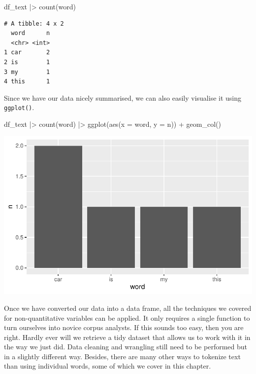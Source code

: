 \documentclass[
  letterpaper,
]{krantz}
\makeatletter
\newenvironment{Shaded}{\begin{snugshade}}{\end{snugshade}}
\newcommand{\AttributeTok}[1]{\textcolor[rgb]{0.40,0.45,0.13}{#1}}
\newcommand{\FunctionTok}[1]{\textcolor[rgb]{0.28,0.35,0.67}{#1}}
\newcommand{\NormalTok}[1]{\textcolor[rgb]{0.00,0.23,0.31}{#1}}
\newcommand{\SpecialCharTok}[1]{\textcolor[rgb]{0.37,0.37,0.37}{#1}}
\newenvironment{kframe}{%
\medskip{}
\setlength{\fboxsep}{.8em}
 \def\at@end@of@kframe{}%
 \ifinner\ifhmode%
  \def\at@end@of@kframe{\end{minipage}}%
  \begin{minipage}{\columnwidth}%
 \fi\fi%
 \def\FrameCommand##1{\hskip\@totalleftmargin \hskip-\fboxsep
 \colorbox{shadecolor}{##1}\hskip-\fboxsep
     \hskip-\linewidth \hskip-\@totalleftmargin \hskip\columnwidth}%
 \MakeFramed {\advance\hsize-\width
   \@totalleftmargin\z@ \linewidth\hsize
   \@setminipage}}%
 {\par\unskip\endMakeFramed%
 \at@end@of@kframe}
\renewenvironment{Shaded}{\begin{kframe}}{\end{kframe}}
\makeatother
\begin{document}
\begin{Shaded}
\begin{Highlighting}[]
\NormalTok{df\_text }\SpecialCharTok{|\textgreater{}} \FunctionTok{count}\NormalTok{(word)}
\end{Highlighting}
\end{Shaded}

\begin{verbatim}
# A tibble: 4 x 2
  word      n
  <chr> <int>
1 car       2
2 is        1
3 my        1
4 this      1
\end{verbatim}

Since we have our data nicely summarised, we can also easily visualise
it using \texttt{ggplot()}.

\begin{Shaded}
\begin{Highlighting}[]
\NormalTok{df\_text }\SpecialCharTok{|\textgreater{}}
  \FunctionTok{count}\NormalTok{(word) }\SpecialCharTok{|\textgreater{}}
  \FunctionTok{ggplot}\NormalTok{(}\FunctionTok{aes}\NormalTok{(}\AttributeTok{x =}\NormalTok{ word,}
             \AttributeTok{y =}\NormalTok{ n)) }\SpecialCharTok{+}
  \FunctionTok{geom\_col}\NormalTok{()}
\end{Highlighting}
\end{Shaded}

\includegraphics{14_mixed_methods_files/figure-pdf/visualise-word-freq-1.pdf}

Once we have converted our data into a data frame, all the techniques we
covered for non-quantitative variables can be applied. It only requires
a single function to turn ourselves into novice corpus analysts. If this
sounds too easy, then you are right. Hardly ever will we retrieve a tidy
dataset that allows us to work with it in the way we just did. Data
cleaning and wrangling still need to be performed but in a slightly
different way. Besides, there are many other ways to tokenize text than
using individual words, some of which we cover in this chapter.
\end{document}
